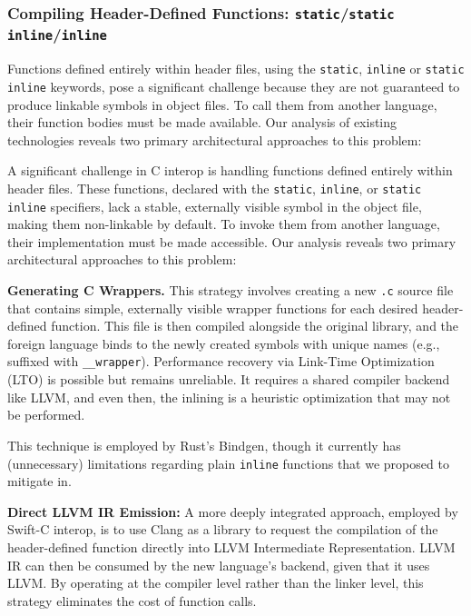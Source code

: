 \subsubsection{Compiling Header-Defined Functions: \texttt{static}/\texttt{static inline}/\texttt{inline}}

Functions defined entirely within header files, using the \texttt{static}, \texttt{inline} or \texttt{static inline} keywords, pose a significant challenge because they are not guaranteed to produce linkable symbols in object files. To call them from another language, their function bodies must be made available. Our analysis of existing technologies reveals two primary architectural approaches to this problem:

A significant challenge in C interop is handling functions defined entirely within header files. These functions, declared with the \texttt{static}, \texttt{inline}, or \texttt{static inline} specifiers, lack a stable, externally visible symbol in the object file, making them non-linkable by default. To invoke them from another language, their implementation must be made accessible. Our analysis reveals two primary architectural approaches to this problem:

\textbf{Generating C Wrappers.} This strategy involves creating a new \texttt{.c} source file that contains simple, externally visible wrapper functions for each desired header-defined function. This file is then compiled alongside the original library, and the foreign language binds to the newly created symbols with unique names (e.g., suffixed with \texttt{\_\_wrapper}). Performance recovery via Link-Time Optimization (LTO) is possible but remains unreliable. It requires a shared compiler backend like LLVM, and even then, the inlining is a heuristic optimization that may not be performed.

This technique is employed by Rust's Bindgen, though it currently has (unnecessary) limitations regarding plain \texttt{inline} functions\cite{bindgen-inline-limitation} that we proposed to mitigate in\cite{bindgen-inline-proposal}.

\textbf{Direct LLVM IR Emission:} A more deeply integrated approach, employed by Swift-C interop, is to use Clang as a library to request the compilation of the header-defined function directly into LLVM Intermediate Representation. LLVM IR can then be consumed by the new language's backend, given that it uses LLVM. By operating at the compiler level rather than the linker level, this strategy eliminates the cost of function calls.

